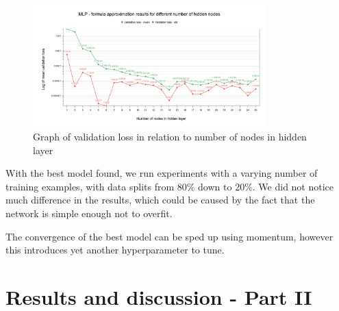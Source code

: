 \documentclass[a4paper]{article}
\begin{document}
\begin{figure}[h!]
	\centering
	\includegraphics[width=9cm]{img/MLP - formula approximation results for different number of hidden nodes.png}
	\caption{Graph of validation loss in relation to number of nodes in hidden layer}
	\label{fig:mlp_nh}
\end{figure}

With the best model found, we run experiments with a varying number of training examples, with data splits from 80\% down to 20\%. We did not notice much difference in the results, which could be caused by the fact that the network is simple enough not to overfit.

The convergence of the best model can be sped up using momentum, however this introduces yet another hyperparameter to tune.


\section{Results and discussion - Part II} %

\end{document}
